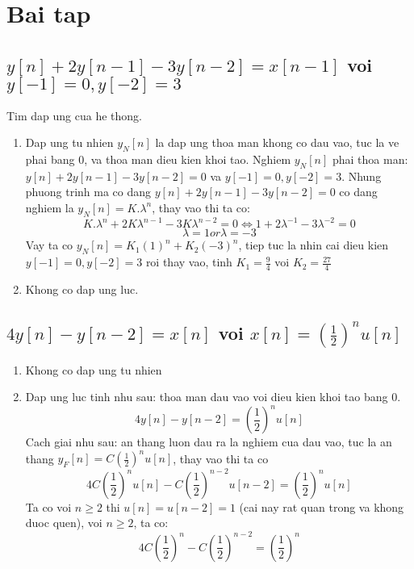 \documentclass{article}
\begin{document}
\section{Bai tap}
\subsection{$y[n]+2y[n-1]-3y[n-2]=x[n-1]$ voi $y[-1]=0, y[-2]=3$}
Tim dap ung cua he thong.
\begin{enumerate}
    \item Dap ung tu nhien $y_{N}[n]$ la dap ung thoa man khong co dau vao, tuc la ve phai bang 0, va thoa man dieu kien khoi tao. Nghiem $y_{N}[n]$ phai thoa man: $y[n]+2y[n-1]-3y[n-2]=0$ va $y[-1]=0, y[-2]=3$.
Nhung phuong trinh ma co dang $y[n]+2y[n-1]-3y[n-2]=0$ co dang nghiem la $y_{N}[n] = K.\lambda^{n}$, thay vao thi ta co:
\begin{equation*}
    K.\lambda^{n}+2K\lambda^{n-1}-3K\lambda^{n-2}=0 \Leftrightarrow 1 + 2\lambda^{-1}-3\lambda^{-2}=0
\end{equation*}
  \begin{equation*}
    \lambda = 1 or \lambda = -3
  \end{equation*}
Vay ta co $y_{N}[n] = K_{1}(1)^{n} + K_{2}(-3)^{n}$, tiep tuc la nhin cai dieu kien $y[-1] = 0, y[-2] = 3$ roi thay vao, tinh $K_{1}=\frac{9}{4}$ voi $K_{2}=\frac{27}{4}$
    \item Khong co dap ung luc.
\end{enumerate}
\subsection{$4y[n]-y[n-2]=x[n]$ voi $x[n]=\left(\frac{1}{2}\right)^{n}u[n]$}
\begin{enumerate}
    \item Khong co dap ung tu nhien
    \item Dap ung luc tinh nhu sau: thoa man dau vao voi dieu kien khoi tao bang 0.
    \begin{equation*}
        4y[n]-y[n-2]=\left(\frac{1}{2}\right)^{n}u[n]
    \end{equation*}
    Cach giai nhu sau: an thang luon dau ra la nghiem cua dau vao, tuc la an thang $y_{F}[n]=C\left(\frac{1}{2}\right)^{n}u[n]$, thay vao thi ta co
    \begin{equation*}
        4C\left(\frac{1}{2}\right)^{n}u[n]-C\left(\frac{1}{2}\right)^{n-2}u[n-2]=\left(\frac{1}{2}\right)^{n}u[n]
    \end{equation*}
    Ta co voi $n\geq2$ thi $u[n]=u[n-2]=1$ (cai nay rat quan trong va khong duoc quen), voi $n\geq2$, ta co:
    \begin{equation*}
        4C\left(\frac{1}{2}\right)^{n}-C\left(\frac{1}{2}\right)^{n-2}=\left(\frac{1}{2}\right)^{n}
    \end{equation*}
\end{enumerate}
\end{document}
